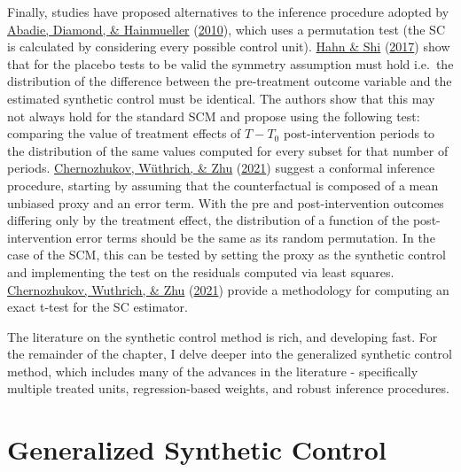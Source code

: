 \documentclass[12pt,nobind, a4paper]{reedthesis}
\begin{document}
 Finally, studies have proposed alternatives to the inference procedure adopted by \protect\hyperlink{ref-abadie_synthetic_2010}{Abadie, Diamond, \& Hainmueller} (\protect\hyperlink{ref-abadie_synthetic_2010}{2010}), which uses a permutation test (the SC is calculated by considering every possible control unit). \protect\hyperlink{ref-hahn_synthetic_2017}{Hahn \& Shi} (\protect\hyperlink{ref-hahn_synthetic_2017}{2017}) show that for the placebo tests to be valid the symmetry assumption must hold i.e.~the distribution of the difference between the pre-treatment outcome variable and the estimated synthetic control must be identical. The authors show that this may not always hold for the standard SCM and propose using the following test: comparing the value of treatment effects of \(T-T_{0}\) post-intervention periods to the distribution of the same values computed for every subset for that number of periods. \protect\hyperlink{ref-chernozhukov_exact_2021}{Chernozhukov, Wüthrich, \& Zhu} (\protect\hyperlink{ref-chernozhukov_exact_2021}{2021}) suggest a conformal inference procedure, starting by assuming that the counterfactual is composed of a mean unbiased proxy and an error term. With the pre and post-intervention outcomes differing only by the treatment effect, the distribution of a function of the post-intervention error terms should be the same as its random permutation. In the case of the SCM, this can be tested by setting the proxy as the synthetic control and implementing the test on the residuals computed via least squares. \protect\hyperlink{ref-chernozhukov_t-test_2021}{Chernozhukov, Wuthrich, \& Zhu} (\protect\hyperlink{ref-chernozhukov_t-test_2021}{2021}) provide a methodology for computing an exact t-test for the SC estimator.
 \linebreak

 The literature on the synthetic control method is rich, and developing fast. For the remainder of the chapter, I delve deeper into the generalized synthetic control method, which includes many of the advances in the literature - specifically multiple treated units, regression-based weights, and robust inference procedures.

 \hypertarget{gscm}{%
 \section{Generalized Synthetic Control}\label{gscm}}
\end{document}
